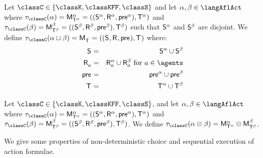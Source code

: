 \begin{definition}\label{afl-choice}
    Let $\classC \in \{\classK, \classKFF, \classS\}$ and let $\alpha, \beta \in \langAflAct$ where $\tau_\classC(\alpha) = \aPModel[\alpha]{\aStatesT[\alpha]} = \aPModelTuple[\alpha]{\aStatesT[\alpha]}$ and $\tau_\classC(\beta) = \aPModel[\beta]{\aStatesT[\beta]} = \aPModelTuple[\beta]{\aStatesT[\beta]}$ such that $\aStates[\alpha]$ and $\aStates[\beta]$ are disjoint.
    We define $\tau_\classC(\alpha \choice \beta) = \aPModel{\aStatesT} = \aPModelTuple{\aStatesT}$ where:
    \begin{eqnarray*}
        \aStates &=& \aStates[\alpha] \cup \aStates[\beta]\\
        \aAccessibility{\agentA} &=& \aAccessibility[\alpha]{\agentA} \cup \aAccessibility[\beta]{\agentA} \text{ for } \agentA \in \agents\\
        \aPrecondition &=& \aPrecondition[\alpha] \cup \aPrecondition[\beta]\\
        \aStatesT &=& \aStatesT[\alpha] \cup \aStatesT[\beta]
    \end{eqnarray*}
\end{definition}

\begin{definition}\label{afl-sequential}
    Let $\classC \in \{\classK, \classKFF, \classS\}$, and let $\alpha, \beta \in \langAflAct$ where $\tau_\classC(\alpha) = \aPModel[\alpha]{\aStatesT[\alpha]} = \aPModelTuple[\alpha]{\aStatesT[\alpha]}$ and $\tau_\classC(\beta) = \aPModel[\beta]{\aStatesT[\beta]} = \aPModelTuple[\beta]{\aStatesT[\beta]}$.
    We define $\tau_\classC(\alpha \compose \beta) = \aPModel[\alpha]{\aStatesT[\alpha]} \exec \aPModel[\beta]{\aStatesT[\beta]}$.
\end{definition}

We give some properties of non-deterministic choice and sequential execution
of action formulae.

